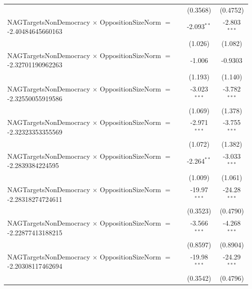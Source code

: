 \begin{tabular}{lcc}
                                                                                & (0.3568)             & (0.4752)\\   
   NAGTargetsNonDemocracy $\times$ OppositionSizeNorm $=$ -2.40484645660163     & -2.093$^{**}$        & -2.803$^{***}$\\   
                                                                                & (1.026)              & (1.082)\\   
   NAGTargetsNonDemocracy $\times$ OppositionSizeNorm $=$ -2.32701190962263     & -1.006               & -0.9303\\   
                                                                                & (1.193)              & (1.140)\\   
   NAGTargetsNonDemocracy $\times$ OppositionSizeNorm $=$ -2.32550055919586     & -3.023$^{***}$       & -3.782$^{***}$\\   
                                                                                & (1.069)              & (1.378)\\   
   NAGTargetsNonDemocracy $\times$ OppositionSizeNorm $=$ -2.32323353355569     & -2.971$^{***}$       & -3.755$^{***}$\\   
                                                                                & (1.072)              & (1.382)\\   
   NAGTargetsNonDemocracy $\times$ OppositionSizeNorm $=$ -2.2839384224595      & -2.264$^{**}$        & -3.033$^{***}$\\   
                                                                                & (1.009)              & (1.061)\\   
   NAGTargetsNonDemocracy $\times$ OppositionSizeNorm $=$ -2.28318274724611     & -19.97$^{***}$       & -24.28$^{***}$\\   
                                                                                & (0.3523)             & (0.4790)\\   
   NAGTargetsNonDemocracy $\times$ OppositionSizeNorm $=$ -2.22877413188215     & -3.566$^{***}$       & -4.268$^{***}$\\   
                                                                                & (0.8597)             & (0.8904)\\   
   NAGTargetsNonDemocracy $\times$ OppositionSizeNorm $=$ -2.20308117462694     & -19.98$^{***}$       & -24.29$^{***}$\\   
                                                                                & (0.3542)             & (0.4796)\\   

\end{tabular}
